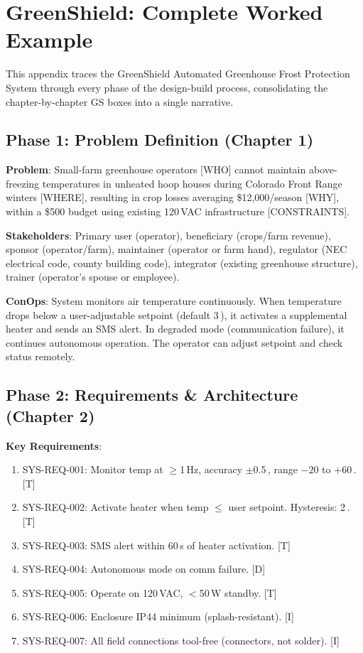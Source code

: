 \chapter*{GreenShield: Complete Worked Example}

This appendix traces the GreenShield Automated Greenhouse Frost Protection System through every phase of the design-build process, consolidating the chapter-by-chapter \textsf{GS} boxes into a single narrative.

\section*{Phase 1: Problem Definition (Chapter 1)}
\textbf{Problem}: Small-farm greenhouse operators [WHO] cannot maintain above-freezing temperatures in unheated hoop houses during Colorado Front Range winters [WHERE], resulting in crop losses averaging \$12,000/season [WHY], within a \$500 budget using existing 120\,VAC infrastructure [CONSTRAINTS].

\textbf{Stakeholders}: Primary user (operator), beneficiary (crops/farm revenue), sponsor (operator/farm), maintainer (operator or farm hand), regulator (NEC electrical code, county building code), integrator (existing greenhouse structure), trainer (operator's spouse or employee).

\textbf{ConOps}: System monitors air temperature continuously. When temperature drops below a user-adjustable setpoint (default 3\,\degC{}), it activates a supplemental heater and sends an SMS alert. In degraded mode (communication failure), it continues autonomous operation. The operator can adjust setpoint and check status remotely.

\section*{Phase 2: Requirements \& Architecture (Chapter 2)}
\textbf{Key Requirements}:
\begin{enumerate}[nosep,leftmargin=1.5em]
\item SYS-REQ-001: Monitor temp at $\geq$1\,Hz, accuracy $\pm$0.5\,\degC{}, range $-20$ to $+60$\,\degC{}. [T]
\item SYS-REQ-002: Activate heater when temp $\leq$ user setpoint. Hysteresis: 2\,\degC{}. [T]
\item SYS-REQ-003: SMS alert within 60\,s of heater activation. [T]
\item SYS-REQ-004: Autonomous mode on comm failure. [D]
\item SYS-REQ-005: Operate on 120\,VAC, $<$50\,W standby. [T]
\item SYS-REQ-006: Enclosure IP44 minimum (splash-resistant). [I]
\item SYS-REQ-007: All field connections tool-free (connectors, not solder). [I]
\end{enumerate}

